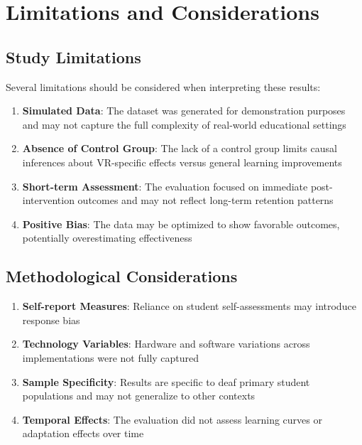 \documentclass[12pt,a4paper]{article}
\begin{document}
\section{Limitations and Considerations}

\subsection{Study Limitations}

Several limitations should be considered when interpreting these results:

\begin{enumerate}
    \item \textbf{Simulated Data}: The dataset was generated for demonstration purposes and may not capture the full complexity of real-world educational settings
    
    \item \textbf{Absence of Control Group}: The lack of a control group limits causal inferences about VR-specific effects versus general learning improvements
    
    \item \textbf{Short-term Assessment}: The evaluation focused on immediate post-intervention outcomes and may not reflect long-term retention patterns
    
    \item \textbf{Positive Bias}: The data may be optimized to show favorable outcomes, potentially overestimating effectiveness
\end{enumerate}

\subsection{Methodological Considerations}

\begin{enumerate}
    \item \textbf{Self-report Measures}: Reliance on student self-assessments may introduce response bias
    
    \item \textbf{Technology Variables}: Hardware and software variations across implementations were not fully captured
    
    \item \textbf{Sample Specificity}: Results are specific to deaf primary student populations and may not generalize to other contexts
    
    \item \textbf{Temporal Effects}: The evaluation did not assess learning curves or adaptation effects over time
\end{enumerate}
\end{document}
